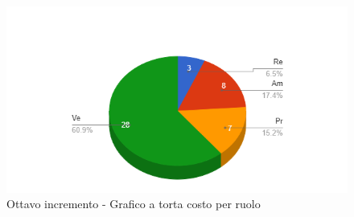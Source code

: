 {{        \begin{figure}[H]
          \includegraphics[width=15cm]{sezioni/images/ottavoT.png}
          \centering
          \caption{Ottavo incremento - Grafico a torta costo per ruolo}
       \end{figure}
    }

    }


